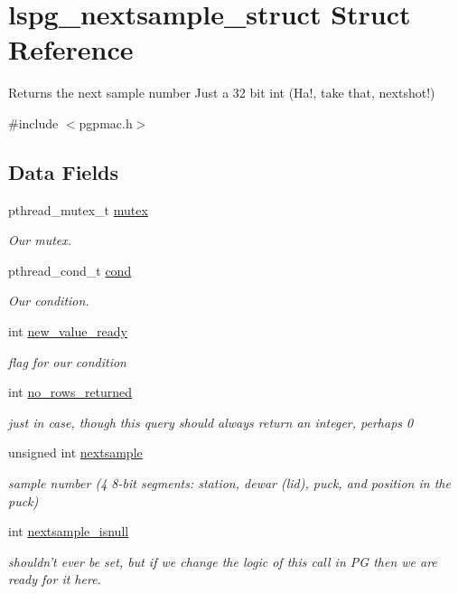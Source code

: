 \hypertarget{structlspg__nextsample__struct}{\section{lspg\-\_\-nextsample\-\_\-struct Struct Reference}
\label{structlspg__nextsample__struct}
}


Returns the next sample number Just a 32 bit int (Ha!, take that, nextshot!)  




{\ttfamily \#include $<$pgpmac.\-h$>$}

\subsection*{Data Fields}
\begin{DoxyCompactItemize}
\item 
pthread\-\_\-mutex\-\_\-t \hyperlink{structlspg__nextsample__struct_a99408b5825e2510f07be199d2cdc3633}{mutex}
\begin{DoxyCompactList}\small\item\em Our mutex. \end{DoxyCompactList}\item 
pthread\-\_\-cond\-\_\-t \hyperlink{structlspg__nextsample__struct_a5b46e4537dac3be839f6c3eeff6b46b6}{cond}
\begin{DoxyCompactList}\small\item\em Our condition. \end{DoxyCompactList}\item 
int \hyperlink{structlspg__nextsample__struct_ab1c9e9d3dc5140137a7ccf908e95f69e}{new\-\_\-value\-\_\-ready}
\begin{DoxyCompactList}\small\item\em flag for our condition \end{DoxyCompactList}\item 
int \hyperlink{structlspg__nextsample__struct_aeee8110133db9f1895237ed9b54dd873}{no\-\_\-rows\-\_\-returned}
\begin{DoxyCompactList}\small\item\em just in case, though this query should always return an integer, perhaps 0 \end{DoxyCompactList}\item 
unsigned int \hyperlink{structlspg__nextsample__struct_aecd82b329462ae06bc2f0d162985a086}{nextsample}
\begin{DoxyCompactList}\small\item\em sample number (4 8-\/bit segments\-: station, dewar (lid), puck, and position in the puck) \end{DoxyCompactList}\item 
int \hyperlink{structlspg__nextsample__struct_a2ca6e2a667c9fe7f1a54329de04d2a3c}{nextsample\-\_\-isnull}
\begin{DoxyCompactList}\small\item\em shouldn't ever be set, but if we change the logic of this call in P\-G then we are ready for it here. \end{DoxyCompactList}\end{DoxyCompactItemize}


